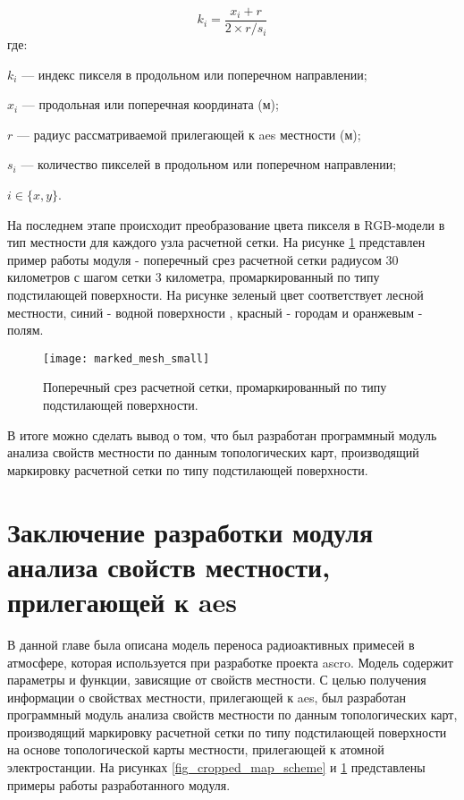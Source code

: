 \begin{equation}
    \label{eq_pix_to_coords}
    k_i = \frac{x_i+r}{2 \times r / s_i}    
\end{equation}
где:
\begin{description}
    \item $k_i$ --- индекс пикселя в продольном или поперечном направлении;
    \item $x_i$ --- продольная или поперечная координата (м);
    \item $r$ --- радиус рассматриваемой прилегающей к \ac{aes} местности (м);
    \item $s_i$ --- количество пикселей в продольном или поперечном направлении;
    \item $i \in \{x, y\}$.
\end{description}

На последнем этапе происходит преобразование цвета пикселя в RGB-модели в тип местности для каждого узла расчетной сетки. 
На рисунке \ref{fig_marked_mesh} представлен пример работы модуля - поперечный срез расчетной сетки радиусом 30 
километров с шагом сетки 3 километра, промаркированный по типу подстилающей поверхности. На рисунке зеленый цвет 
соответствует лесной местности, синий - водной поверхности , красный - городам и оранжевым - полям. 

\begin{figure}[ht]
\centering
    \texttt{[image: marked\_mesh\_small]}
    \captionsetup{justification=centering}
    \caption{Поперечный срез расчетной сетки, промаркированный по типу подстилающей поверхности.}
    \label{fig_marked_mesh}
\end{figure}

В итоге можно сделать вывод о том, что был разработан программный модуль анализа свойств местности по данным 
топологических карт, производящий маркировку расчетной сетки по типу подстилающей поверхности.

\section{Заключение разработки модуля анализа свойств местности, прилегающей к \ac{aes}}

В данной главе была описана модель переноса радиоактивных примесей в атмосфере, которая используется при разработке 
проекта \ac{ascro}. Модель содержит параметры и функции, зависящие от свойств местности. С целью получения информации о 
свойствах местности, прилегающей к \ac{aes}, был разработан программный модуль анализа свойств местности по данным 
топологических карт, производящий маркировку расчетной сетки по типу подстилающей поверхности на основе топологической 
карты местности, прилегающей к атомной электростанции. На рисунках \ref{fig_cropped_map_scheme} и \ref{fig_marked_mesh} 
представлены примеры работы разработанного модуля.